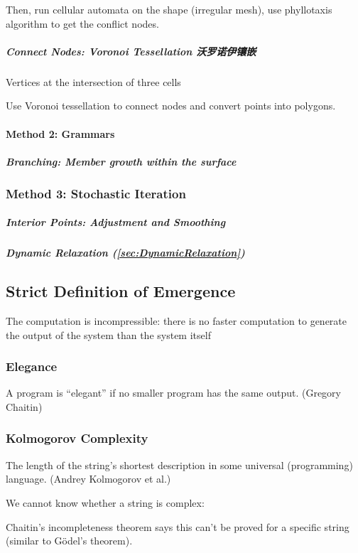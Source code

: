 \documentclass[a4paper, openany]{book}
\begin{document}
Then, run cellular automata on the shape (irregular mesh), use phyllotaxis algorithm to get the conflict nodes.

\subparagraph{Connect Nodes: Voronoi Tessellation 沃罗诺伊镶嵌}

Vertices at the intersection of three cells

Use Voronoi tessellation to connect nodes and convert points into polygons.

\paragraph{Method 2: Grammars}

\subparagraph{Branching: Member growth within the surface}

\subsubsection{Method 3: Stochastic Iteration}

\subparagraph{Interior Points: Adjustment and Smoothing}

\subparagraph{Dynamic Relaxation (\textbf{\cref{sec:DynamicRelaxation}})}

\subsection{Strict Definition of Emergence}

The computation is incompressible: there is no faster computation to generate the output of the system than the system itself

\subsubsection{Elegance}

A program is ``elegant'' if no smaller program has the same output. (Gregory Chaitin)

\subsubsection{Kolmogorov Complexity}

The length of the string's shortest description in some universal (programming) language. (Andrey Kolmogorov et al.)

We cannot know whether a string is complex: 

Chaitin's incompleteness theorem says this can't be proved for a specific string (similar to Gödel's theorem).
\end{document}
